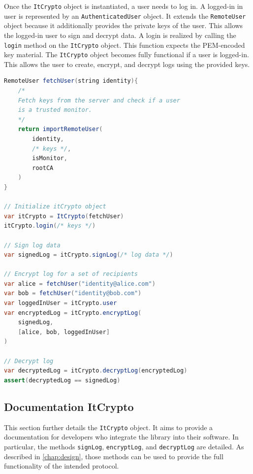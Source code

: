 \documentclass[../main.tex]{subfiles}
\begin{document}
Once the \verb|ItCrypto| object is instantiated, a user needs to log in.
A logged-in in user is represented by an \verb|AuthenticatedUser| object.
It extends the \verb|RemoteUser| object because it additionally provides the private keys of the user.
This allows the logged-in user to sign and decrypt data.
A login is realized by calling the \verb|login| method on the \verb|ItCrypto| object.
This function expects the PEM-encoded key material.
The \verb|ItCrypto| object becomes fully functional if a user is logged-in.
This allows the user to create, encrypt, and decrypt logs using the provided keys.

\begin{lstlisting}[basicstyle=\small, label=lst:pseudocode,float,floatplacement=tbp, language=Java, caption={[Library usage]Pseudocode of creating, encrypting, and decrypting logs using the provided libraries.}, morekeywords={RemoteUser, var, assert}, commentstyle=\color{codegreen}]
RemoteUser fetchUser(string identity){
    /*
    Fetch keys from the server and check if a user 
    is a trusted monitor.
    */
    return importRemoteUser(
        identity,
        /* keys */, 
        isMonitor, 
        rootCA
    )
}

// Initialize itCrypto object
var itCrypto = ItCrypto(fetchUser)
itCrypto.login(/* keys */)

// Sign log data
var signedLog = itCrypto.signLog(/* log data */)

// Encrypt log for a set of recipients
var alice = fetchUser("identity@alice.com")
var bob = fetchUser("identity@bob.com")
var loggedInUser = itCrypto.user
var encryptedLog = itCrypto.encryptLog(
    signedLog, 
    [alice, bob, loggedInUser]
)

// Decrypt log
var decryptedLog = itCrypto.decryptLog(encryptedLog)
assert(decryptedLog == signedLog)
\end{lstlisting}

\subsection{Documentation ItCrypto}
This section further details the \verb|ItCrypto| object.
It aims to provide a documentation for developers who integrate the library into their software.
In particular, the methods \verb|signLog|, \verb|encryptLog|, and \verb|decryptLog| are detailed.
As described in \cref{chap:design}, those methods can be used to provide the full functionality of the intended protocol.
\end{document}
